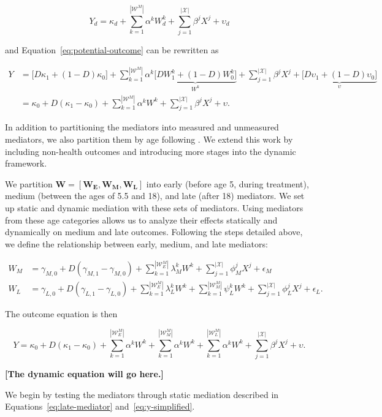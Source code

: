\begin{equation}
\label{eq:y-simplified}
Y_d = \kappa_d + \sum_{k=1}^{|\mathcal{W}^M|} \alpha^k W_d^k  + \sum_{j = 1}^{|\mathcal{X}|} \beta^j X^j + \upsilon_d
\end{equation}

\noindent and Equation~\eqref{eq:potential-outcome} can be rewritten as

\begin{align}
\label{eq:y-simplified}
Y &= \big[ D\kappa_1 + (1-D)\kappa_0 \big] + \sum_{k=1}^{|\mathcal{W}^M|} \alpha^k \underbrace{\big [ DW_1^k + (1-D)W_0^k \big]}_{W^k}  + \sum_{j = 1}^{|\mathcal{X}|} \beta^j X^j + \underbrace{\big[ D\upsilon_1 + (1-D)\upsilon_0 \big]}_{\upsilon} \nonumber \\
&= \kappa_0 + D(\kappa_1 - \kappa_0) + \sum_{k=1}^{|\mathcal{W}^M|} \alpha^k W^k + \sum_{j = 1}^{|\mathcal{X}|} \beta^j X^j + \upsilon.
\end{align}

In addition to partitioning the mediators into measured and unmeasured mediators, we also partition them by age following \citet{Conti_etal_2016_LongTermHealth}. We extend this work by including non-health outcomes and introducing more stages into the dynamic framework.

We partition $\bm{W} = [ \bm{W_E}, \bm{W_M}, \bm{W_L} ]$ into early (before age 5, during treatment), medium (between the ages of 5.5 and 18), and late (after 18) mediators. We set up static and dynamic mediation with these sets of mediators. Using mediators from these age categories allows us to analyze their effects statically and dynamically on medium and late outcomes. Following the steps detailed above, we define the relationship between early, medium, and late mediators:

\begin{align}
W_M &= \gamma_{M,0} + D(\gamma_{M,1} - \gamma_{M,0}) + \sum_{k=1}^{|\mathcal{W}^M_E|} \lambda_M^k W^k + \sum_{j = 1}^{|\mathcal{X}|} \phi_M^j X^j + \epsilon_M \label{eq:med-mediator}\\
W_L &= \gamma_{L,0} + D(\gamma_{L,1} - \gamma_{L,0}) + \sum_{k=1}^{|\mathcal{W}^M_E|} \lambda_L^k W^k + \sum_{k=1}^{|\mathcal{W}^M_M|} \psi_L^k W^k + \sum_{j = 1}^{|\mathcal{X}|} \phi_L^j X^j + \epsilon_L \label{eq:late-mediator}.
\end{align}

The outcome equation is then

\begin{equation}
\label{y-age-mediators}
Y = \kappa_0 + D(\kappa_1 - \kappa_0) + \sum_{k=1}^{|\mathcal{W}^M_E|} \alpha^k W^k + \sum_{k=1}^{|\mathcal{W}^M_M|} \alpha^k W^k+ \sum_{k=1}^{|\mathcal{W}^M_L|} \alpha^k W^k + \sum_{j = 1}^{|\mathcal{X}|} \beta^j X^j + \upsilon.
\end{equation}

\textbf{[The dynamic equation will go here.]}

We begin by testing the mediators through static mediation described in Equations~\ref{eq:late-mediator} and~\ref{eq:y-simplified}.
